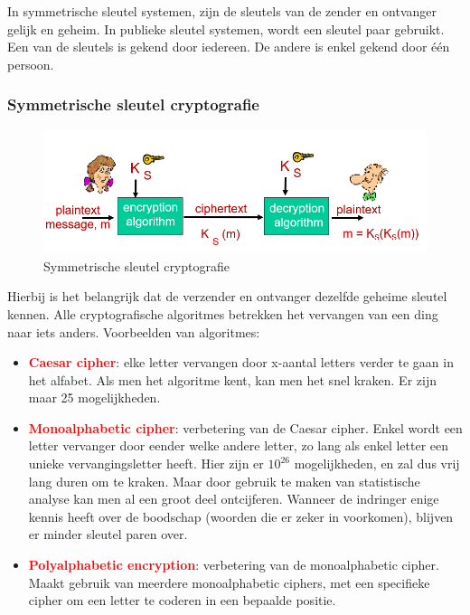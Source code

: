 In symmetrische sleutel systemen, zijn de sleutels van de zender en ontvanger gelijk en geheim.
In publieke sleutel systemen, wordt een sleutel paar gebruikt. Een van de sleutels is gekend door iedereen. De andere is enkel gekend door één persoon.

\subsubsection{Symmetrische sleutel cryptografie}

\begin{figure}[h]
    \centering
    \includegraphics[width=7in]{./img/imghfdst8/hfdst8puntje3.png}
    \caption{Symmetrische sleutel cryptografie }      
    \label{fig:Symmetrische sleutel cryptografie }
\end{figure}


Hierbij is het belangrijk dat de verzender en ontvanger dezelfde geheime sleutel kennen.
Alle cryptografische algoritmes betrekken het vervangen van een ding naar iets anders.
Voorbeelden van algoritmes:
\begin{itemize}
    \item \textcolor{red}{\textbf{Caesar cipher}}: elke letter vervangen door x-aantal letters verder te gaan in het alfabet. Als men het algoritme kent, kan men het snel kraken. Er zijn maar 25 mogelijkheden.
    \item \textcolor{red}{\textbf{Monoalphabetic cipher}}: verbetering van de Caesar cipher. Enkel wordt een letter vervanger door eender welke andere letter, zo lang als enkel letter een unieke vervangingsletter heeft. Hier zijn er $10^{26}$ mogelijkheden, en zal dus vrij lang duren om te kraken. Maar door gebruik te maken van statistische analyse kan men al een groot deel ontcijferen. Wanneer de indringer enige kennis heeft over de boodschap (woorden die er zeker in voorkomen), blijven er minder sleutel paren over.
    \item \textcolor{red}{\textbf{Polyalphabetic encryption}}: verbetering van de monoalphabetic cipher. Maakt gebruik van meerdere monoalphabetic ciphers, met een specifieke cipher om een letter te coderen in een bepaalde positie.
\end{itemize}



